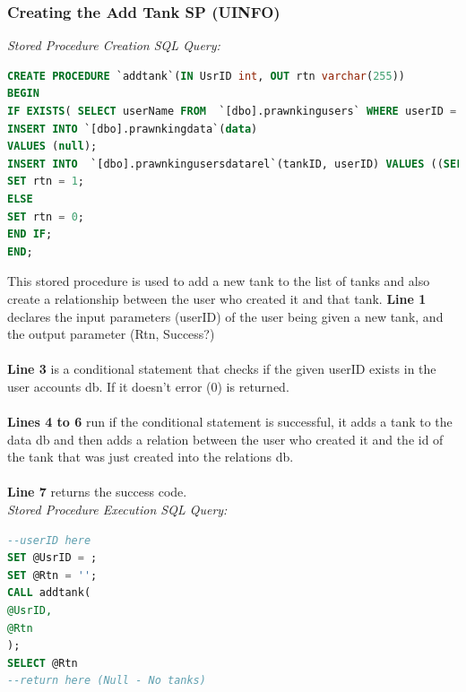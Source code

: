 \documentclass[a4paper,11pt]{proc}
\begin{document}
\subsubsection{Creating the Add Tank SP (UINFO)}
\textit{Stored Procedure Creation SQL Query:}
\begin{lstlisting}[language=SQL,
deletekeywords={IDENTITY,INT},
morekeywords={clustered,OUT, BEGIN, PROCEDURE},    
framesep=10pt,
framextopmargin=10pt]
CREATE PROCEDURE `addtank`(IN UsrID int, OUT rtn varchar(255))
BEGIN
IF EXISTS( SELECT userName FROM  `[dbo].prawnkingusers` WHERE userID = UsrID) THEN
INSERT INTO `[dbo].prawnkingdata`(data)
VALUES (null);
INSERT INTO  `[dbo].prawnkingusersdatarel`(tankID, userID) VALUES ((SELECT LAST_INSERT_ID()),UsrID);
SET rtn = 1;
ELSE
SET rtn = 0;
END IF;
END;
\end{lstlisting}
This stored procedure is used to add a new tank to the list of tanks and also create a relationship between the user who created it and that tank. \textbf{Line 1} declares the input parameters (userID) of the user being given a new tank, and the output parameter (Rtn, Success?)\\
\\\textbf{Line 3} is  a conditional statement that checks if the given userID exists in the user accounts db. If it doesn't error (0) is returned.\\
\\\textbf{Lines 4 to 6} run if the conditional statement is successful, it adds a tank to the data db and then adds a relation between the user who created it and the id of the tank that was just created into the relations db.\\
\\\textbf{Line 7} returns the success code.
\\\textit{Stored Procedure Execution SQL Query:}
\begin{lstlisting}[language=SQL,
deletekeywords={IDENTITY,INT},
morekeywords={clustered,OUT, BEGIN, PROCEDURE,CALL},    
framesep=10pt,
framextopmargin=10pt]
--userID here
SET @UsrID = ;
SET @Rtn = '';
CALL addtank(
@UsrID,
@Rtn
);
SELECT @Rtn
--return here (Null - No tanks)
\end{lstlisting}
\end{document}
